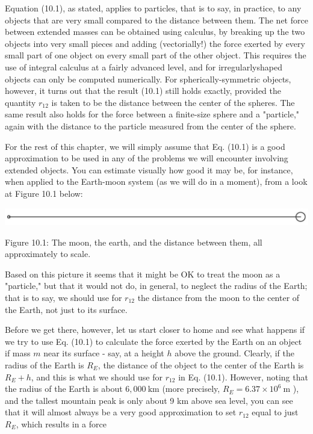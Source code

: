 \documentclass[10pt]{article}
\begin{document}
Equation (10.1), as stated, applies to particles, that is to say, in practice, to any objects that are very small compared to the distance between them. The net force between extended masses can be obtained using calculus, by breaking up the two objects into very small pieces and adding (vectorially!) the force exerted by every small part of one object on every small part of the other object. This requires the use of integral calculus at a fairly advanced level, and for irregularlyshaped objects can only be computed numerically. For spherically-symmetric objects, however, it turns out that the result (10.1) still holds exactly, provided the quantity $r_{12}$ is taken to be the distance between the center of the spheres. The same result also holds for the force between a finite-size sphere and a "particle," again with the distance to the particle measured from the center of the sphere.

For the rest of this chapter, we will simply assume that Eq. (10.1) is a good approximation to be used in any of the problems we will encounter involving extended objects. You can estimate visually how good it may be, for instance, when applied to the Earth-moon system (as we will do in a moment), from a look at Figure 10.1 below:

\begin{center}
\includegraphics[max width=\textwidth]{2024_09_14_9969b06773f10b6936e8g-240}
\end{center}

Figure 10.1: The moon, the earth, and the distance between them, all approximately to scale.

Based on this picture it seems that it might be OK to treat the moon as a "particle," but that it would not do, in general, to neglect the radius of the Earth; that is to say, we should use for $r_{12}$ the distance from the moon to the center of the Earth, not just to its surface.

Before we get there, however, let us start closer to home and see what happens if we try to use Eq. (10.1) to calculate the force exerted by the Earth on an object if mass $m$ near its surface - say, at a height $h$ above the ground. Clearly, if the radius of the Earth is $R_{E}$, the distance of the object to the center of the Earth is $R_{E}+h$, and this is what we should use for $r_{12}$ in Eq. (10.1). However, noting that the radius of the Earth is about $6,000 \mathrm{~km}$ (more precisely, $R_{E}=6.37 \times 10^{6} \mathrm{~m}$ ), and the tallest mountain peak is only about 9 km above sea level, you can see that it will almost always be a very good approximation to set $r_{12}$ equal to just $R_{E}$, which results in a force
\end{document}

